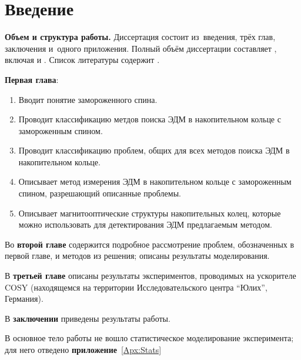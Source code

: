 \chapter*{Введение}                         %

\newcommand{\actuality}{}
\newcommand{\progress}{}
\newcommand{\aim}{{\textbf\aimTXT}}
\newcommand{\tasks}{\textbf{\tasksTXT}}
\newcommand{\novelty}{\textbf{\noveltyTXT}}
\newcommand{\influence}{\textbf{\influenceTXT}}
\newcommand{\methods}{\textbf{\methodsTXT}}
\newcommand{\defpositions}{\textbf{\defpositionsTXT}}
\newcommand{\reliability}{\textbf{\reliabilityTXT}}
\newcommand{\probation}{\textbf{\probationTXT}}
\newcommand{\contribution}{\textbf{\contributionTXT}}
\newcommand{\publications}{\textbf{\publicationsTXT}}


\textbf{Объем и структура работы.} Диссертация состоит из~введения, трёх глав,
заключения и~одного приложения.
%
Полный объём диссертации составляет
, включая
 и
.   Список литературы содержит
.

\textbf{Первая глава}: 
\begin{enumerate}
	\item Вводит понятие замороженного спина.
	\item Проводит классификацию метдов поиска ЭДМ в накопительном кольце с замороженным спином.
	\item Проводит классификацию проблем, общих для всех методов поиска ЭДМ в накопительном кольце.
	\item Описывает метод измерения ЭДМ в накопительном кольце с замороженным спином, разрешающий описанные проблемы.
	\item Описывает магнитооптические структуры накопительных колец, которые можно использовать для детектирования ЭДМ предлагаемым методом.
\end{enumerate}

Во \textbf{второй главе} содержится подробное рассмотрение проблем, обозначенных в первой главе, и методов из решения; описаны результаты моделирования. 

В \textbf{третьей главе} описаны результаты экспериментов, проводимых на ускорителе COSY (находящемся на территории Исследовательского центра ``Юлих'', Германия).

В \textbf{заключении} приведены результаты работы.

В основное тело работы не вошло статистическое моделирование эксперимента; для него отведено \textbf{приложение}~\ref{Apx:Stats}